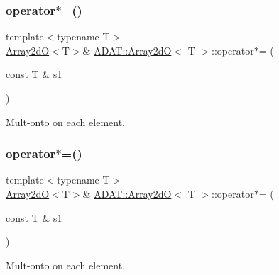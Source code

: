 \subsubsection{\texorpdfstring{operator$\ast$=()}{operator*=()}\hspace{0.1cm}{\footnotesize\ttfamily [5/6]}}
{\footnotesize\ttfamily template$<$typename T$>$ \\
\mbox{\hyperlink{classADAT_1_1Array2dO}{Array2dO}}$<$T$>$\& \mbox{\hyperlink{classADAT_1_1Array2dO}{A\+D\+A\+T\+::\+Array2dO}}$<$ T $>$\+::operator$\ast$= (\begin{DoxyParamCaption}\item[{const T \&}]{s1 }\end{DoxyParamCaption})\hspace{0.3cm}{\ttfamily [inline]}}



Mult-\/onto on each element. 

\mbox{\label{classADAT_1_1Array2dO_a12856ac75f975aa6b013eac9eadd7180}} 
\subsubsection{\texorpdfstring{operator$\ast$=()}{operator*=()}\hspace{0.1cm}{\footnotesize\ttfamily [6/6]}}
{\footnotesize\ttfamily template$<$typename T$>$ \\
\mbox{\hyperlink{classADAT_1_1Array2dO}{Array2dO}}$<$T$>$\& \mbox{\hyperlink{classADAT_1_1Array2dO}{A\+D\+A\+T\+::\+Array2dO}}$<$ T $>$\+::operator$\ast$= (\begin{DoxyParamCaption}\item[{const T \&}]{s1 }\end{DoxyParamCaption})\hspace{0.3cm}{\ttfamily [inline]}}



Mult-\/onto on each element. 

\mbox{\label{classADAT_1_1Array2dO_ad74aea8e13378655e8abe2a2bbddb7bc}} 
